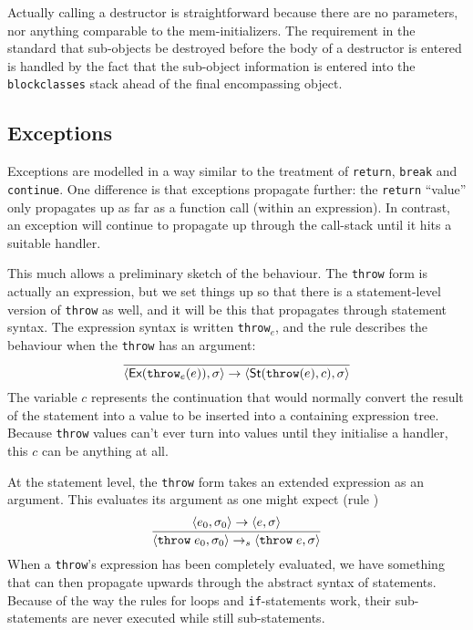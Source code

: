 \documentclass[11pt]{article}
\begin{document}
Actually calling a destructor is straightforward because there are no
parameters, nor anything comparable to the mem-initializers.  The
requirement in the standard that sub-objects be destroyed before the
body of a destructor is entered is handled by the fact that the
sub-object information is entered into the \texttt{blockclasses} stack
ahead of the final encompassing object.

\subsection{Exceptions}
\label{sec:exceptions}

Exceptions are modelled in a way similar to the treatment of
\texttt{return}, \texttt{break} and \texttt{continue}.  One difference
is that exceptions propagate further: the \texttt{return} ``value''
only propagates up as far as a function call (within an expression).
In contrast, an exception will continue to propagate up through the
call-stack until it hits a suitable handler.

\newcommand{\ethrow}{\texttt{throw}\ensuremath{_e}}
This much allows a preliminary sketch of the behaviour.  The
\texttt{throw} form is actually an expression, but we set things up so
that there is a statement-level version of \texttt{throw} as well, and
it will be this that propagates through statement syntax.  The
expression syntax is written \ethrow{}, and the rule
 describes the behaviour when the
\texttt{throw} has an argument:
\[
\infer{
  \statebrack{\textsf{Ex}(\ethrow(e)), \sigma}
  \to
  \statebrack{\textsf{St}(\texttt{throw}(e),c), \sigma}}{}
\]
The variable $c$ represents the continuation that would normally
convert the result of the statement into a value to be inserted into a
containing expression tree.  Because \texttt{throw} values can't ever
turn into values until they initialise a handler, this $c$ can be
anything at all.

At the statement level, the \texttt{throw} form takes an extended
expression as an argument.  This evaluates its argument as one might
expect (rule )
\[
\infer{\statebrack{\texttt{throw}\;e_0,\sigma_0}\stmtarrow\statebrack{\texttt{throw}\;e,\sigma}}{\statebrack{e_0,\sigma_0}\to\statebrack{e,\sigma}}
\]
When a \texttt{throw}'s expression has been completely evaluated, we
have something that can then propagate upwards through the abstract
syntax of statements.  Because of the way the rules for loops and
\texttt{if}-statements work, their sub-statements are never executed
while still sub-statements.
\end{document}
